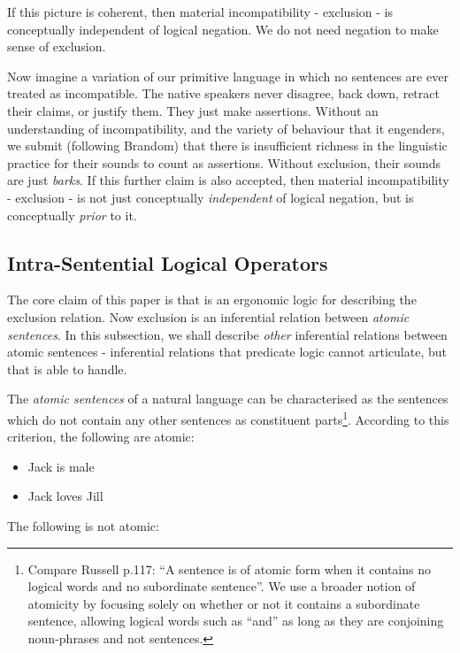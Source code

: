 If this picture is coherent, then material incompatibility - exclusion - is conceptually independent of logical negation.
We do not need negation to make sense of exclusion.

Now imagine a variation of our primitive language in which no sentences are ever treated as incompatible.
The native speakers never disagree, back down, retract their claims, or justify them. They just make assertions.
Without an understanding of incompatibility, and the variety of behaviour that it engenders, we submit (following Brandom) that there is insufficient richness in the linguistic practice for their sounds to count as assertions.
Without exclusion, their sounds are just \emph{barks}.
If this further claim is also accepted, then material incompatibility - exclusion - is not just conceptually \emph{independent} of logical negation, but is conceptually \emph{prior} to it.


\subsection{Intra-Sentential Logical Operators}

The core claim of this paper is that \ELFULL{} is an ergonomic logic for describing the exclusion relation.
Now exclusion is an inferential relation between \emph{atomic sentences}. 
In this subsection, we shall describe \emph{other} inferential relations between atomic sentences - inferential relations that predicate logic cannot articulate, but that \ELFULL{} is able to handle.

The \emph{atomic sentences} of a natural language can be
characterised as the sentences which do not contain any other
sentences as constituent parts\footnote{Compare Russell \cite{russell}
  p.117: ``A sentence is of atomic form when it contains no logical
  words and no subordinate sentence''. We use a broader notion of
  atomicity by focusing solely on whether or not it contains a
  subordinate sentence, allowing logical words such as ``and'' as long
  as they are conjoining noun-phrases and not sentences.}.  According
to this criterion, the following are atomic:

\begin{itemize}

\item Jack is male
\item Jack loves Jill
\end{itemize}

\NI The following is not atomic:

